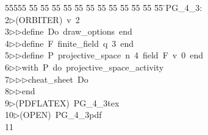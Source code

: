 %
%
\begin{tabbing}
55555 \= 55 \= 55 \= 55 \= 55 \= 55 \= 55 \= 55 \= 55 \= 55 \= 55 \= 55 \= 55 \= \>PG\_4\_3:\\[0pt]
2\>$\triangleright$\>(ORBITER)\ v\ 2\ \\[0pt]
3\>$\triangleright$\>$\triangleright$\>define\ Do\ draw\_options\ end\ \\[0pt]
4\>$\triangleright$\>$\triangleright$\>define\ F\ finite\_field\ q\ 3\ end\ \\[0pt]
5\>$\triangleright$\>$\triangleright$\>define\ P\ projective\_space\ n\ 4\ field\ F\ v\ 0\ end\ \\[0pt]
6\>$\triangleright$\>$\triangleright$\>with\ P\ do\ projective\_space\_activity\ \\[0pt]
7\>$\triangleright$\>$\triangleright$\>$\triangleright$\>cheat\_sheet\ Do\ \\[0pt]
8\>$\triangleright$\>$\triangleright$\>end\\[0pt]
9\>$\triangleright$\>(PDFLATEX)\ PG\_4\_3tex\ \\[0pt]
10\>$\triangleright$\>(OPEN)\ PG\_4\_3pdf\\[0pt]
11\>\end{tabbing}
